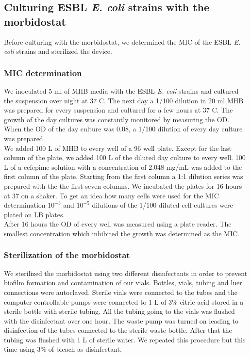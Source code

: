 \subsection{Culturing ESBL \textit{E. coli} strains with the morbidostat}
Before culturing with the morbidostat, we determined the MIC of the ESBL \textit{E. coli} strains and sterilized the device.

\subsubsection{MIC determination}
We inoculated 5 ml of MHB media with the ESBL \textit{E. coli} strains and cultured the suspension over night at 37 \degree C. The next day a 1/100 dilution in 20 ml MHB was prepared for every suspension and cultured for a few hours at 37 \degree C. The growth of the day cultures was constantly monitored by measuring the OD. When the OD of the day culture was 0.08, a 1/100 dilution of every day culture was prepared. \\
We added 100 \textmu L of MHB to every well of a 96 well plate. Except for the last column of the plate, we added 100 \textmu L of the diluted day culture to every well. 100 \textmu L of a cefepime solution with a concentration of 2.048 mg/mL was added to the first column of the plate. Starting from the first column a 1:1 dilution series was prepared with the the first seven columns. We incubated the plates for 16 hours at 37 \degree \space on a shaker. To get an idea how many cells were used for the MIC determination $10^{-3}$ and $10^{-5}$ dilutions of the 1/100 diluted cell cultures were plated on LB plates.\\
After 16 hours the OD of every well was measured using a plate reader. The smallest concentration which inhibited the growth was determined as the MIC. 
\label{section:mic_determination}

\subsubsection{Sterilization of the morbidostat}
We sterilized the morbidostat using two different disinfectants in order to prevent biofilm formation and contamination of our vials.
Bottles, vials, tubing and luer connections were autoclaved. Sterile vials were connected to the tubes and the computer controllable pumps were connected to 1 L of 3\% citric acid stored in a sterile bottle with sterile tubing. All the tubing going to the vials was flushed with the disinfectant over one hour. The waste pump was turned on leading to disinfection of the tubes connected to the sterile waste bottle. After that the tubing was flushed with 1 L of sterile water. We repeated this procedure but this time using 3\% of bleach as disinfectant.
\label{section:sterilization}

